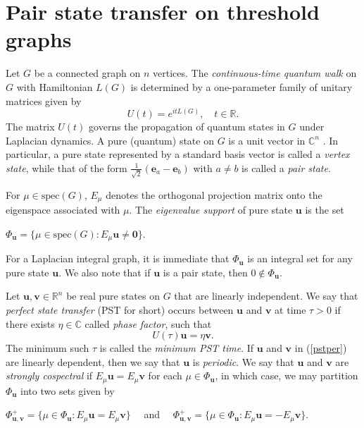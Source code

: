 \documentclass[preprint]{elsarticle}
\newcommand{\supp}{{\Phi}}
\newcommand\spec{{\mathrm{spec}}}
\begin{document}
\section{Pair state transfer on threshold graphs}
\label{sec:5}

Let $G$ be a connected graph on $n$ vertices. The {\sl continuous-time quantum walk} on $G$ with Hamiltonian $L(G)$ is determined by a one-parameter family of unitary matrices given by
\begin{equation*}
U(t)=e^{it L(G)},\quad t\in\mathbb{R}.
\end{equation*}
The matrix $U(t)$ governs the propagation of quantum states in $G$ under Laplacian dynamics. A pure (quantum) state on $G$ is a unit vector in $\mathbb{C}^n$ \cite{godsil2025perfect}. In particular, a pure state represented by a standard basis vector is called a \textit{vertex state}, while that of the form $\frac{1}{\sqrt{2}}(\mathbf{e}_a-\mathbf{e}_b)$ with $a\neq b$ is called a \textit{pair state}. 

For $\mu\in \spec(G)$, $E_{\mu}$ denotes the orthogonal projection matrix onto the eigenspace associated with $\mu$. The \textit{eigenvalue support} of pure state $\mathbf{u}$ is the set
\begin{center}
$\supp_{\mathbf{u}}=\{\mu\in \spec(G):E_\mu\mathbf{u}\neq\mathbf{0}\}$. 
\end{center}
For a Laplacian integral graph, it is immediate that $\supp_{\mathbf{u}}$ is an integral set for any pure state $\mathbf{u}$. We also note that if $\mathbf{u}$ is a pair state, then $0\notin \supp_{\mathbf{u}}$. 

Let $\mathbf{u},\mathbf{v}\in\mathbb{R}^n$ be real pure states on $G$ that are linearly independent. We say that {\sl perfect state transfer} (PST for short) occurs between $\mathbf{u}$ and $\mathbf{v}$ at time $\tau>0$ if
there exists $\eta\in\mathbb{C}$ called {\sl phase factor}, such that
\begin{equation}
\label{pstper}
U(\tau) \mathbf{u} = \eta \mathbf{v}.
\end{equation}
The minimum such $\tau$ is called the \textit{minimum PST time}. If $\mathbf{u}$ and $\mathbf{v}$ in (\ref{pstper}) are linearly dependent, then we say that $\mathbf{u}$ is \textit{periodic}. We say that $\mathbf{u}$ and $\mathbf{v}$ are \textit{strongly cospectral} if $E_\mu\mathbf{u}=E_\mu\mathbf{v}$ for each $\mu\in\supp_{\mathbf{u}}$, in which case, we may partition $\supp_{\mathbf{u}}$ into two sets given by
\begin{center}
$\supp_{\mathbf{u},\mathbf{v}}^+=\{\mu\in \supp_{\mathbf{u}}:E_\mu\mathbf{u}=E_\mu\mathbf{v}\}\quad $ and $\quad \supp_{\mathbf{u},\mathbf{v}}^+=\{\mu\in \supp_{\mathbf{u}}:E_\mu\mathbf{u}=-E_\mu\mathbf{v}\}$.
\end{center}
\end{document}

